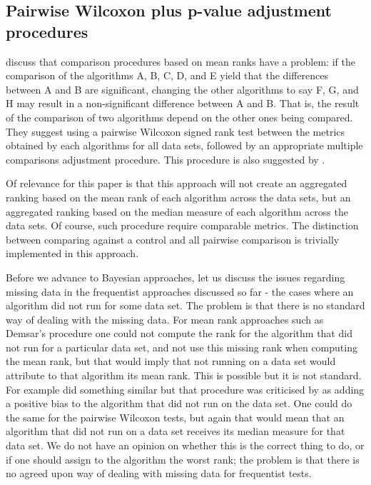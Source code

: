 \documentclass[twoside,11pt,preprint]{article}
\begin{document}
\hypertarget{pairwise-wilcoxon-plus-p-value-adjustment-procedures}{%
\subsection{\texorpdfstring{Pairwise Wilcoxon plus p-value adjustment procedures \label{sec:pairwil}}{Pairwise Wilcoxon plus p-value adjustment procedures }}\label{pairwise-wilcoxon-plus-p-value-adjustment-procedures}}

\citet{benavoli2016should} discuss that comparison procedures based on mean
ranks have a problem: if the comparison of the algorithms A, B, C, D,
and E yield that the differences between A and B are significant,
changing the other algorithms to say F, G, and H may result in a
non-significant difference between A and B. That is, the result of
the comparison of two algorithms depend on the other ones being
compared. They suggest using a pairwise Wilcoxon signed rank test
between the metrics obtained by each algorithms for all data sets,
followed by an appropriate multiple comparisons adjustment procedure.
This procedure is also suggested by \citet{STAPOR2021107219}.

Of relevance for this paper is that this approach will not create an
aggregated ranking based on the mean rank of each algorithm across the
data sets, but an aggregated ranking based on the median measure of
each algorithm across the data sets. Of course, such procedure
require comparable metrics. The distinction between comparing against
a control and all pairwise comparison is trivially implemented in this
approach.

Before we advance to Bayesian approaches, let us discuss the issues
regarding missing data in the frequentist approaches discussed so
far - the cases where an algorithm did not run for some data set. The
problem is that there is no standard way of dealing with the missing
data. For mean rank approaches such as Demsar's procedure one could
not compute the rank for the algorithm that did not run for a
particular data set, and not use this missing rank when computing the
mean rank, but that would imply that not running on a data set would
attribute to that algorithm its mean rank. This is possible but it is
not standard. For example \citet{fernandez2014we} did something similar but
that procedure was criticised by \citet{wainberg2016random} as adding a
positive bias to the algorithm that did not run on the data set. One could do the same
for the pairwise Wilcoxon tests, but again that would mean that an
algorithm that did not run on a data set receives its median measure
for that data set. We do not have an opinion on whether this is the
correct thing to do, or if one should assign to the algorithm the
worst rank; the problem is that there is no agreed upon way of dealing
with missing data for frequentist tests.
\end{document}
